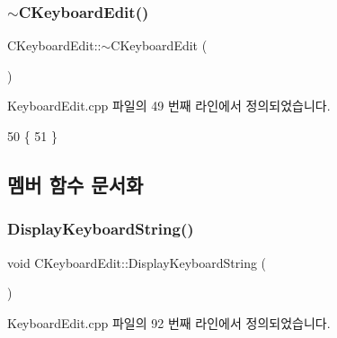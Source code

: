 \subsubsection{\texorpdfstring{$\sim$\+C\+Keyboard\+Edit()}{~CKeyboardEdit()}}
{\footnotesize\ttfamily C\+Keyboard\+Edit\+::$\sim$\+C\+Keyboard\+Edit (\begin{DoxyParamCaption}{ }\end{DoxyParamCaption})\hspace{0.3cm}{\ttfamily [virtual]}}



Keyboard\+Edit.\+cpp 파일의 49 번째 라인에서 정의되었습니다.


\begin{DoxyCode}
50 \{
51 \}
\end{DoxyCode}


\subsection{멤버 함수 문서화}
\mbox{\label{class_c_keyboard_edit_a432e346d4d5285064b5e92ff4c6a0385}} 
\subsubsection{\texorpdfstring{Display\+Keyboard\+String()}{DisplayKeyboardString()}}
{\footnotesize\ttfamily void C\+Keyboard\+Edit\+::\+Display\+Keyboard\+String (\begin{DoxyParamCaption}{ }\end{DoxyParamCaption})\hspace{0.3cm}{\ttfamily [protected]}}



Keyboard\+Edit.\+cpp 파일의 92 번째 라인에서 정의되었습니다.



